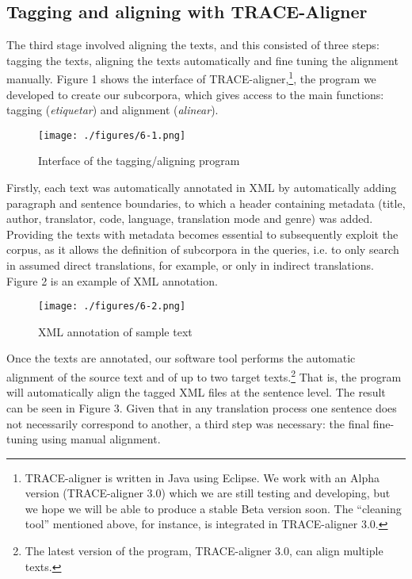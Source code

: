 \documentclass[output=paper]{LSP/langsci}
\begin{document}
\subsection{Tagging and aligning with TRACE-Aligner}

The third stage involved aligning the texts, and this consisted of three steps: tagging the texts, aligning the texts automatically and fine tuning the alignment manually. Figure 1 shows the interface of TRACE-aligner,\footnote{TRACE-aligner is written in Java using Eclipse. We work with an Alpha version (TRACE-aligner 3.0) which we are still testing and developing, but we hope we will be able to produce a stable Beta version soon. The “cleaning tool” mentioned above, for instance, is integrated in TRACE-aligner 3.0.}, the program we developed to create our subcorpora, which gives access to the main functions: tagging (\textit{etiquetar}) and alignment (\textit{alinear}).  

\begin{figure} 
\texttt{[image: ./figures/6-1.png]}
\caption{Interface of the tagging/aligning program}
\end{figure}

Firstly, each text was automatically annotated in XML by automatically adding paragraph and sentence boundaries, to which a header containing metadata (title, author, translator, code, language, translation mode and genre) was added. Providing the texts with metadata becomes essential to subsequently exploit the corpus, as it allows the definition of subcorpora in the queries, i.e. to only search in assumed direct translations, for example, or only in indirect translations. Figure 2 is an example of XML annotation.

\begin{figure}
\texttt{[image: ./figures/6-2.png]}
\caption{XML annotation of sample text}
\end{figure}

Once the texts are annotated, our software tool performs the automatic alignment of the source text and of up to two target texts.\footnote{The latest version of the program, TRACE-aligner 3.0, can align multiple texts.}  That is, the program will automatically align the tagged XML files at the sentence level. The result can be seen in Figure 3. Given that in any translation process one sentence does not necessarily correspond to another, a third step was necessary: the final fine-tuning using manual alignment.
\end{document}
